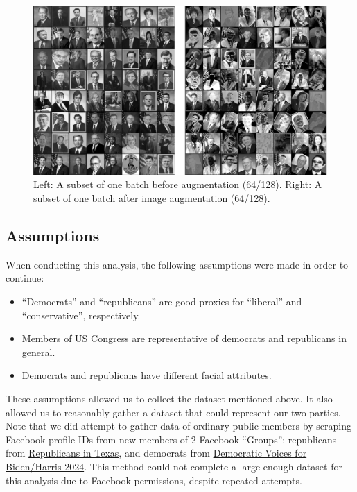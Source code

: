 \documentclass[manuscript,screen,review]{acmart}
\begin{document}
\begin{figure}[h]
  \centering
  \includegraphics[width=\linewidth]{../presentation/batch_both.png}
  \caption{Left: A subset of one batch before augmentation (64/128). Right: A subset of one batch after image augmentation (64/128).}
  \label{fig:batch}
\end{figure}

\subsection{Assumptions}

When conducting this analysis, the following assumptions were made in order to continue:

\begin{itemize}
\item ``Democrats'' and ``republicans'' are good proxies for ``liberal'' and ``conservative'', respectively. 
\item Members of US Congress are representative of democrats and republicans in general. 
\item Democrats and republicans have different facial attributes. 
\end{itemize}

These assumptions allowed us to collect the dataset mentioned above. It also allowed us to reasonably gather a dataset that could represent our two parties. Note that we did attempt to gather data of ordinary public members by scraping Facebook profile IDs from new members of 2 Facebook ``Groups'': republicans from \href{https://www.facebook.com/groups/RU4TX/}{Republicans in Texas}, and democrats from \href{https://www.facebook.com/groups/111188856119651/}{Democratic Voices for Biden/Harris 2024}. This method could not complete a large enough dataset for this analysis due to Facebook permissions, despite repeated attempts.
\end{document}
